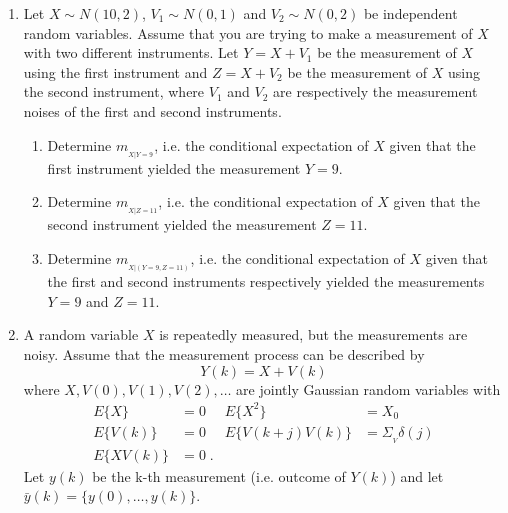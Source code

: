 \documentclass[letterpaper,12pt]{article}
\begin{document}
\begin{enumerate}
\begin{comment}
    \item
    Use MATLAB to plot the output spectral density $\Phi_{YY}(\omega)$ for $\omega \in [-\pi,\,\pi]$.

\end{enumerate}
\end{comment}


\item
Let $X \sim N(10,2)$, $V_1 \sim N(0,1)$ and $V_2 \sim N(0,2)$ be independent random variables. Assume that you are trying to make a measurement of $X$ with two different instruments. Let  $Y = X + V_1$ be the measurement of $X$ using the first instrument and $Z = X + V_2$ be the measurement of $X$ using the second instrument, where $V_1$ and $V_2$ are respectively the measurement noises of the first and second instruments.

\begin{enumerate}

\item
Determine $m_{_{X|Y=9}}$, i.e. the conditional expectation of $X$ given that the first instrument yielded the measurement $Y=9$.

\item
Determine $m_{_{X|Z=11}}$, i.e. the conditional expectation of $X$ given that the second instrument yielded the measurement $Z=11$.

\item
Determine $m_{_{X|(Y=9,Z=11)}}$, i.e. the conditional expectation of $X$ given that the first and second instruments respectively yielded the measurements $Y=9$ and $Z=11$.

\end{enumerate}



\item
A random variable $X$ is repeatedly measured, but the measurements are noisy.  Assume that the measurement process can be described by
\begin{equation*}
    Y(k) = X + V(k)
\end{equation*}
where $X, V(0), V(1), V(2), \ldots$ are jointly Gaussian random variables with
\begin{align*}
    E \{ X \} & = 0
        & E \{ X^2 \} & = X_0 \\
    E \{ V(k) \} & = 0
        & E \{ V(k+j) V(k) \} & = \Sigma_{_{V}} \delta(j) \\
    E \{ X V(k) \} & = 0 \; .
\end{align*}
Let $y(k)$ be the k-th measurement (i.e. outcome of $Y(k)$) and let $\bar{y}(k) = \{ y(0),\ldots,y(k) \}$.


\end{enumerate}
\end{document}
